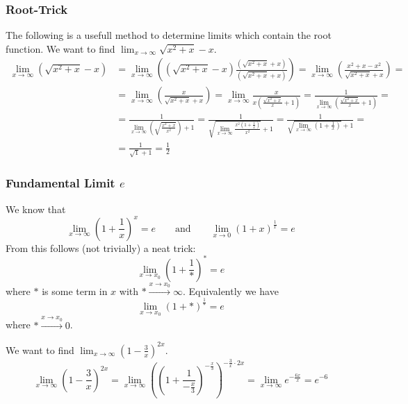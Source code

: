 \subsubsection{Root-Trick}
The following is a usefull method to determine limits which contain the root function.
We want to find \(\lim_{x \to \infty} \sqrt{x^2 + x} - x\).
\begin{equation*}
   \begin{split}
      \lim_{x \to \infty} \left(\sqrt{x^2 + x} - x\right) & = \lim_{x \to \infty} \left(\left(\sqrt{x^2 + x} - x\right) \frac{\left(\sqrt{x^2 + x} + x\right)}{\left(\sqrt{x^2 + x} + x\right)}\right) = \lim_{x \to \infty} \left(\frac{x^2 + x - x^2}{\sqrt{x^2 + x} + x}\right) =\\
                                                          & = \lim_{x \to \infty} \left(\frac{x}{\sqrt{x^2 + x} + x}\right) = \lim_{x \to \infty} \frac{x}{x \left(\frac{\sqrt{x^2 + x}}{x} + 1\right)} = \frac{1}{\lim_{x \to \infty}\left(\frac{\sqrt{x^2 + x}}{x} + 1\right)} =\\
                                                          & = \frac{1}{\lim_{x \to \infty}\left(\sqrt{\frac{x^2 + x}{x^2}}\right) + 1} = \frac{1}{\sqrt{\lim_{x \to \infty}\frac{x^2 \left(1 + \frac{1}{x}\right)}{x^2}} + 1} = \frac{1}{\sqrt{\lim_{x \to \infty}\left(1 + \frac{1}{x}\right)} + 1} =\\
                                                          & = \frac{1}{\sqrt{1} + 1} = \frac{1}{2}
   \end{split}
\end{equation*}

\subsubsection{Fundamental Limit \(e\)}
We know that
\[\lim_{x \to \infty} \left(1 + \frac{1}{x}\right)^x = e \qquad\text{and}\qquad \lim_{x \to 0} (1 + x)^{\frac{1}{x}} = e\]
From this follows (not trivially) a neat trick:
\[\lim_{x \to x_0} \left(1 + \frac{1}{\ast}\right)^* = e\]
where \(\ast\) is some term in \(x\) with \(\ast \xrightarrow{x \to x_0} \infty\).
Equivalently we have
\[\lim_{x \to x_0} (1 + \ast)^{\frac{1}{\ast}} = e\]
where \(\ast \xrightarrow{x \to x_0} 0\).
\begin{example}
   We want to find \(\lim_{x \to \infty} \left(1 - \frac{3}{x}\right)^{2x}\).
   \[\lim_{x \to \infty} \left(1 - \frac{3}{x}\right)^{2x} = \lim_{x \to \infty} \left(\left(1 + \frac{1}{-\frac{x}{3}}\right)^{-\frac{x}{3}}\right)^{-\frac{3}{x} \cdot 2x} = \lim_{x \to \infty} e^{-\frac{6x}{x}} = e^{-6}\]
\end{example}

